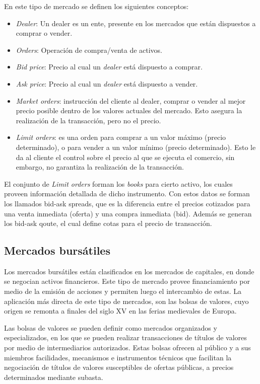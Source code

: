 En este tipo de mercado se definen los siguientes conceptos:
\begin{itemize}
	\item \emph{Dealer}: Un dealer es un ente, presente en los mercados que están dispuestos a comprar o vender.
	\item \emph{Orders}: Operación de compra/venta de activos.
	\item \emph{Bid price}: Precio al cual un \emph{dealer} está dispuesto a comprar.
	\item \emph{Ask price}: Precio al cual un \emph{dealer} está dispuesto a vender.
	\item \emph{Market orders}: instrucción del cliente al dealer, comprar o vender al mejor precio posible dentro de los valores actuales del mercado.
		Esto asegura la realización de la transacción, pero no el precio.
	\item \emph{Limit orders}: es una orden para comprar a un valor máximo (precio determinado), o para vender a un valor mínimo (precio determinado).
		Esto le da al cliente el control sobre el precio al que se ejecuta el comercio, sin embargo, no garantiza la realización de la transacción.
\end{itemize}

El conjunto de \emph{Limit orders} forman los \emph{books} para cierto activo, los cuales proveen información detallada de dicho instrumento. Con estos datos
se forman los llamados bid-ask spreads, que es la diferencia entre el precios cotizados para una venta inmediata (oferta) y una compra inmediata (bid). 
Además se generan los bid-ask qoute, el cual define cotas para el precio de transacción.

\subsection{Mercados bursátiles}
Los mercados bursátiles están clasificados en los mercados de capitales, en donde se negocian activos financieros. Este tipo de mercado provee financiamiento
por medio de la emisión de acciones y permiten luego el intercambio de estas. La aplicación más directa de este tipo de mercados, son las bolsas de valores, cuyo
origen se remonta a finales del siglo XV en las ferias medievales de Europa.

Las bolsas de valores se pueden definir como mercados organizados y especializados, en los que se pueden realizar transacciones de títulos de valores por
medio de intermediarios autorizados. Estas bolsas ofrecen al público y a sus miembros facilidades, mecanismos e instrumentos técnicos que facilitan la negociación
de títulos de valores susceptibles de ofertas públicas, a precios determinados mediante subasta.

